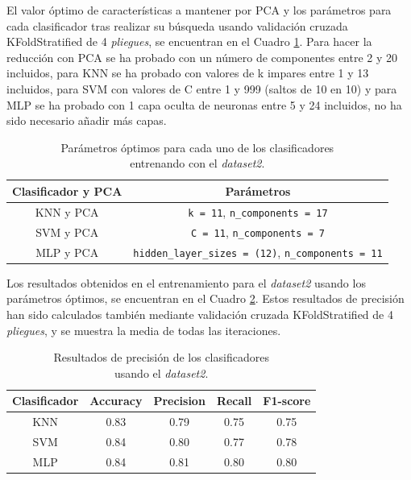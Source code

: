 El valor óptimo de características a mantener por PCA y los parámetros para cada clasificador tras realizar su búsqueda usando validación cruzada KFoldStratified de 4 \textit{pliegues}, se encuentran en el Cuadro \ref{cuadro:parametros_dataset2}. Para hacer la reducción con PCA se ha probado con un número de componentes entre 2 y 20 incluidos, para KNN se ha probado con valores de k impares entre 1 y 13 incluidos, para SVM con valores de C entre 1 y 999 (saltos de 10 en 10) y para MLP se ha probado con 1 capa oculta de neuronas entre 5 y 24 incluidos, no ha sido necesario añadir más capas.\\

\begin{table}[H]
\begin{center}
\begin{tabular}{|c|c|}
     \hline
    \textbf{Clasificador y PCA} & \textbf{Parámetros} \\
    \hline
     KNN y PCA & \verb|k = 11|, \verb|n_components = 17|\\
     SVM y PCA & \verb|C = 11|, \verb|n_components = 7|\\
     MLP y PCA & \verb|hidden_layer_sizes = (12)|, \verb|n_components = 11|\\
     \hline
 \end{tabular}
 \captionsetup{justification=centering}
\caption{Parámetros óptimos para cada uno de los clasificadores\\
entrenando con el \textit{dataset2}.}
\label{cuadro:parametros_dataset2}
\end{center}
\end{table}

Los resultados obtenidos en el entrenamiento para el \textit{dataset2} usando los parámetros óptimos, se encuentran en el Cuadro \ref{cuadro:resultados_dataset2}. Estos resultados de precisión han sido calculados también mediante validación cruzada KFoldStratified de 4 \textit{pliegues}, y se muestra la media de todas las iteraciones.\\

\begin{table}[H]
\begin{center}
\begin{tabular}{|c|c|c|c|c|}
     \hline
    \textbf{Clasificador} & \textbf{Accuracy} & \textbf{Precision} & \textbf{Recall} & \textbf{F1-score}\\
    \hline
     KNN & 0.83 & 0.79 & 0.75 & 0.75\\
     SVM & 0.84 & 0.80 & 0.77 & 0.78\\
     MLP & 0.84 & 0.81 & 0.80 & 0.80\\
     \hline
 \end{tabular}
 \captionsetup{justification=centering}
\caption{Resultados de precisión de los clasificadores\\
usando el \textit{dataset2}.}
\label{cuadro:resultados_dataset2}
\end{center}
\end{table}

